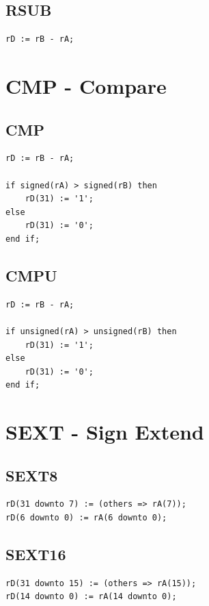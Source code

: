 \documentclass{UoYCSproject}
\begin{document}
\subsection{RSUB}

\begin{lstlisting}
rD := rB - rA;
\end{lstlisting}

\section{CMP - Compare}

\subsection{CMP}

\begin{lstlisting}
rD := rB - rA;

if signed(rA) > signed(rB) then
    rD(31) := '1';
else
    rD(31) := '0';
end if;
\end{lstlisting}

\subsection{CMPU}

\begin{lstlisting}
rD := rB - rA;

if unsigned(rA) > unsigned(rB) then
    rD(31) := '1';
else
    rD(31) := '0';
end if;
\end{lstlisting}

\section{SEXT - Sign Extend}

\subsection{SEXT8}

\begin{lstlisting}
rD(31 downto 7) := (others => rA(7));
rD(6 downto 0) := rA(6 downto 0);
\end{lstlisting}

\subsection{SEXT16}

\begin{lstlisting}
rD(31 downto 15) := (others => rA(15));
rD(14 downto 0) := rA(14 downto 0);
\end{lstlisting}
\end{document}
